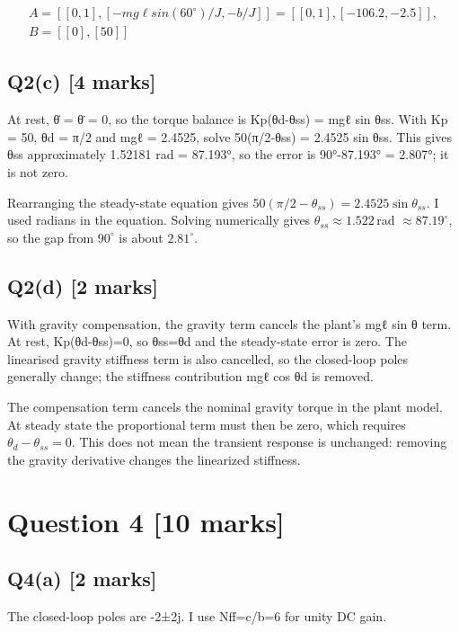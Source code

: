 \documentclass[11pt,a4paper]{article}
\begin{document}
\[\begin{aligned}A = [[0,1], [-mg\ell sin(60^{\circ})/J, -b/J]] = [[0,1], [-106.2, -2.5]],\\ B = [[0],[50]]\end{aligned}\]

\subsection*{Q2(c) \hfill [4 marks]}

At rest, θ̇ = θ̈ = 0, so the torque balance is Kp(θd-θss) = mgℓ sin θss.
With Kp = 50, θd = π/2 and mgℓ = 2.4525, solve 50(π/2-θss) = 2.4525 sin θss.
This gives θss approximately 1.52181 rad = 87.193°, so the error is 90°-87.193° = 2.807°; it is not zero.\par\smallskip Rearranging the steady-state equation gives $50(\pi/2-\theta_{ss})=2.4525\sin\theta_{ss}$. I used radians in the equation. Solving numerically gives $\theta_{ss}\approx1.522\,$rad $\approx87.19^\circ$, so the gap from $90^\circ$ is about $2.81^\circ$.

\subsection*{Q2(d) \hfill [2 marks]}

With gravity compensation, the gravity term cancels the plant's mgℓ sin θ term.
At rest, Kp(θd-θss)=0, so θss=θd and the steady-state error is zero.
The linearised gravity stiffness term is also cancelled, so the closed-loop poles generally change; the stiffness contribution mgℓ cos θd is removed.\par\smallskip The compensation term cancels the nominal gravity torque in the plant model. At steady state the proportional term must then be zero, which requires $\theta_d-\theta_{ss}=0$. This does not mean the transient response is unchanged: removing the gravity derivative changes the linearized stiffness.

\section*{Question 4 \hfill [10 marks]}
\subsection*{Q4(a) \hfill [2 marks]}

The closed-loop poles are -2±2j.
I use Nff=c/b=6 for unity DC gain.
\end{document}
